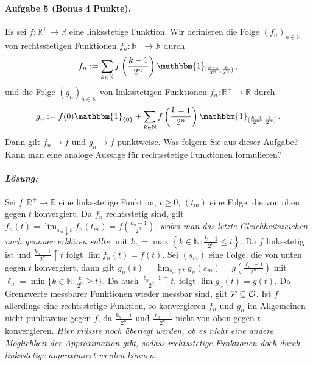 \documentclass{article}
\begin{document}
\paragraph{Aufgabe 5 \textnormal{(Bonus 4 Punkte)}.}
Es sei $f\colon\mathbb{R}^+\to\mathbb{R}$ eine linksstetige Funktion.
Wir definieren die Folge $(f_n)_{n\in\mathbb{N}}$ von rechtsstetigen Funktionen $f_n\colon\mathbb{R}^+\to\mathbb{R}$ durch
\[
f_n:=\sum_{k\in\mathbb{N}}f\left(\frac{k-1}{2^n}\right)\mathbbm{1}_{[\frac{k-1}{2^n},\frac{k}{2^n})}\,,
\]
und  die Folge $(g_n)_{n\in\mathbb{N}}$ von linksstetigen Funktionen $f_n\colon\mathbb{R}^+\to\mathbb{R}$ durch
\[
g_n:=f(0)\mathbbm{1}_{\{0\}}+\sum_{k\in\mathbb{N}}f\left(\frac{k-1}{2^n}\right)\mathbbm{1}_{(\frac{k-1}{2^n},\frac{k}{2^n}]}\,.
\]
Dann gilt $f_n\to f$ und $g_n\to f$ punktweise.
Was folgern Sie aus dieser Aufgabe?
Kann man eine analoge Aussage für rechtsstetige Funktionen formulieren?

\paragraph{\emph{\textnormal{Lösung:}}} Sei $f\colon \mathbb{R}^+\to\mathbb{R}$ eine linksstetige Funktion, $t\geq0$, $(t_m)$ eine Folge, die von oben gegen $t$ konvergiert.
Da $f_n$ rechtsstetig sind, gilt $f_n(t)=\lim_{s_m\downarrow t}f_n(t_m)=f\left(\frac{k_n-1}{2^n}\right)$,
\emph{wobei man das letzte Gleichheitszeichen noch genauer erklären sollte,}
mit $k_n=\max\left\{k\in\mathbb{N}:\frac{k-1}{2^n}\leq t\right\}$.
Da $f$ linksstetig ist und $\frac{k_n-1}{2^n}\uparrow t$ folgt $\lim f_n(t)=f(t)$.
Sei $(s_m)$ eine Folge, die von unten gegen $t$ konvergiert, dann gilt $g_n(t)=\lim_{s_m\uparrow t}g_n(s_m)=g(\frac{\ell_n-1}{2^n})$ mit $\ell_n=\min\{k\in\mathbb{N}:\frac{k}{2^n}\geq t\}$.
Da auch $\frac{\ell_n-1}{2^n}\uparrow t$, folgt $\lim g_n(t)=g(t)$.
Da Grenzwerte messbarer Funktionen wieder messbar sind, gilt ${\cal P}\subseteq{\cal O}$.
Ist $f$ allerdings eine rechtsstetige Funktion, so konvergieren $f_n$ und $g_n$ im Allgemeinen nicht punktweise gegen $f$, da $\frac{k_n-1}{2^n}$ und $\frac{\ell_n-1}{2^n}$ nicht von oben gegen $t$ konvergieren. \emph{Hier müsste noch überlegt werden, ob es nicht eine andere Möglichkeit der Approximation gibt, sodass rechtsstetige Funktionen doch durch linksstetige approximiert werden können.}

\end{document}
